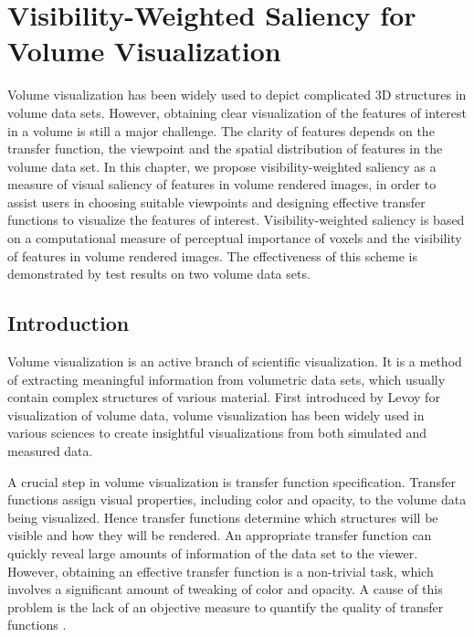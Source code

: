\chapter{Visibility-Weighted Saliency for Volume Visualization \label{visibility-weighted_saliency}}
Volume visualization has been widely used to depict complicated 3D structures in volume data sets.
However, obtaining clear visualization of the features of interest in a volume is still a major challenge.
The clarity of features depends on the transfer function, the viewpoint and the spatial distribution of features in the volume data set.
In this chapter, we propose visibility-weighted saliency as a measure of visual saliency of features in volume rendered images, in order to assist users in choosing suitable viewpoints and designing effective transfer functions to visualize the features of interest. Visibility-weighted saliency is based on a computational measure of perceptual importance of voxels and the visibility of features in volume rendered images.
The effectiveness of this scheme is demonstrated by test results on two volume data sets.

\section{Introduction}
Volume visualization is an active branch of scientific visualization. It is a method of extracting meaningful information from volumetric data sets, which usually contain complex structures of various material.
First introduced by Levoy \cite{levoy_display_1988} for visualization of volume data, volume visualization has been widely used in various sciences to create insightful visualizations from both simulated and measured data.

A crucial step in volume visualization is transfer function specification. Transfer functions assign visual properties, including color and opacity, to the volume data being visualized. Hence transfer functions determine which structures will be visible and how they will be rendered.
An appropriate transfer function can quickly reveal large amounts of information of the data set to the viewer.
However, obtaining an effective transfer function is a non-trivial task, which involves a significant amount of tweaking of color and opacity.
A cause of this problem is the lack of an objective measure to quantify the quality of transfer functions \cite{correa_visibility_2011}.

